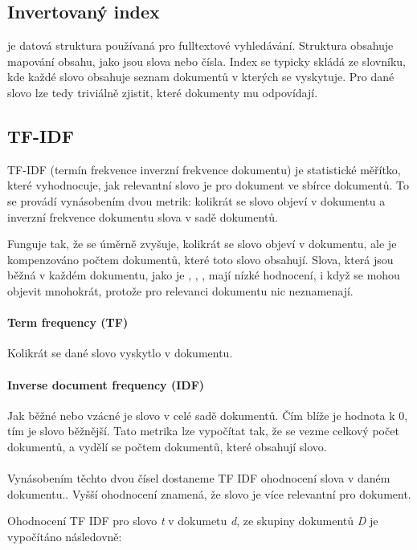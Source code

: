 \documentclass[12pt, a4paper]{article}
\begin{document}
\subsection{Invertovaný index}
\noindent je datová struktura používaná pro fulltextové vyhledávání. Struktura obsahuje mapování obsahu, jako jsou slova nebo čísla. Index se typicky skládá ze slovníku, kde každé slovo obsahuje seznam dokumentů v kterých se vyskytuje. Pro dané slovo lze tedy triviálně zjistit, které dokumenty mu odpovídají.


\subsection{TF-IDF}
\noindent TF-IDF (termín frekvence inverzní frekvence dokumentu) je statistické měřítko, které vyhodnocuje, jak relevantní slovo je pro dokument ve sbírce dokumentů. To se provádí vynásobením dvou metrik: kolikrát se slovo objeví v dokumentu a inverzní frekvence dokumentu slova v sadě dokumentů.

Funguje tak, že se úměrně zvyšuje, kolikrát se slovo objeví v dokumentu, ale je kompenzováno počtem dokumentů, které toto slovo obsahují. Slova, která jsou běžná v každém dokumentu, jako je , , , mají nízké hodnocení, i když se mohou objevit mnohokrát, protože pro relevanci dokumentu nic neznamenají.

\paragraph{Term frequency (TF)}
\noindent Kolikrát se dané slovo vyskytlo v dokumentu.

\paragraph{Inverse document frequency (IDF)}
\noindent Jak běžné nebo vzácné je slovo v celé sadě dokumentů. Čím blíže je hodnota k 0, tím je slovo běžnější. Tato metrika lze vypočítat tak, že se vezme celkový počet dokumentů, a vydělí se počtem dokumentů, které obsahují slovo.

\paragraph{}
\noindent Vynásobením těchto dvou čísel dostaneme TF IDF ohodnocení slova v daném dokumentu.. Vyšší ohodnocení znamená, že slovo je více relevantní pro dokument.

Ohodnocení TF IDF pro slovo \textit{t} v dokumetu \textit{d}, ze skupiny dokumentů \textit{D} je vypočítáno následovně:
\end{document}
